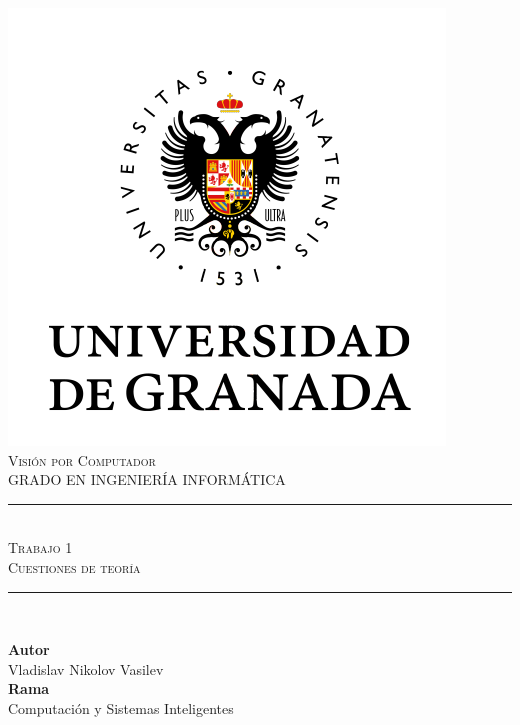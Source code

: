\documentclass[11pt,a4paper]{article}
\newcommand{\asignatura}{Visión por Computador}
\newcommand{\autor}{Vladislav Nikolov Vasilev}
\newcommand{\titulo}{Trabajo 1}
\newcommand{\subtitulo}{Cuestiones de teoría}
\begin{document}

\begin{titlepage}

\begin{minipage}{\textwidth}

\centering

\includegraphics[scale=0.5]{img/ugr.png}\\

\textsc{\Large \asignatura{}\\[0.2cm]}
\textsc{GRADO EN INGENIERÍA INFORMÁTICA}\\[1cm]

\noindent\rule[-1ex]{\textwidth}{1pt}\\[1.5ex]
\textsc{{\Huge \titulo\\[0.5ex]}}
\textsc{{\Large \subtitulo\\}}
\noindent\rule[-1ex]{\textwidth}{2pt}\\[3.5ex]

\end{minipage}

\vspace{0.5cm}

\begin{minipage}{\textwidth}

\centering

\textbf{Autor}\\ {\autor{}}\\[2.5ex]
\textbf{Rama}\\ {Computación y Sistemas Inteligentes}\\[2.5ex]
\vspace{0.3cm}


\end{minipage}
\end{titlepage}
\end{document}
